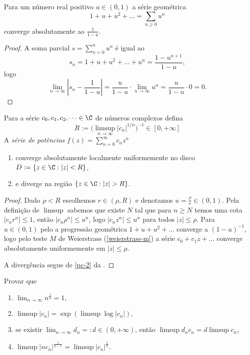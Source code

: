 \begin{prop}
\label{serie-geometrica}
Para um número real positivo $u\in(0,1)$ a série geométrica
\[ 1 + u + u^2 + \dots = \sum_{n\geq 0} u^n \]
converge absolutamente ao $\frac{1}{1-u}$.
\end{prop}
\begin{proof}
A soma parcial $s = \sum_{n=0}^n u^n$ é igual ao
\[ s_n = 1 + u + u^2 + \dots + u^n = \frac{1-u^{n+1}}{1-u}, \]
logo
\[ \lim_{n\to\infty} |s_n - \frac{1}{1-u}|
 = \frac{u}{1-u} \cdot \lim_{n\to\infty} u^n
 = \frac{u}{1-u} \cdot 0 = 0. \]
\end{proof}

\begin{lema}
\label{cauchy-hadamard}
Para a série $c_0,c_1,c_2,\dots \in \C$ de números complexos defina
\begin{equation}
\label{eq:hadamard}
R := \big(\limsup_{n\to\infty} |c_n|^{1/n}\big)^{-1} \in [0,+\infty]
\end{equation}
A \emph{série de potências} $f(z) = \sum_{n=0}^\infty c_n z^n$
\begin{enumerate}
\item converge absolutamente localmente uniformemente no disco $D := \{z\in\C: |z|<R \}$,
\item e diverge na região $\{ z\in\C: |z| > R \}$.
\end{enumerate}
\end{lema}
\begin{proof}
Dado $\rho < R$ escolhemos $r \in (\rho,R)$ e denotamos $u=\frac{\rho}{r} \in (0,1)$.
Pela definição de $\limsup$ sabemos que existe $N$
tal que para $n\geq N$ temos uma cota $|c_n r^n| \leq 1$,
então $|c_n \rho^n| \leq u^n$, logo $|c_n z^n| \leq u^n$ para todos $|z|\leq\rho$.
Para $u\in(0,1)$ pelo 
a progressão geométrica $1+u+u^2 + \dots$ converge a $(1-u)^{-1}$,
logo pelo teste $M$ de Weierstrass (\cref{weierstrass-m})
a série $c_0 + c_1 z + \dots$ converge absolutamente uniformemente em $|z|\leq\rho$.

A divergência segue de \cref{pc-2} da .
\end{proof}

\begin{problema}
\label{raio-derivada}
Provar que
\begin{enumerate}
\item $\lim_{n\to\infty} n^{\frac1n} = 1,$
\item $\limsup |c_n| = \exp(\limsup \log|c_n|),$
\item  se existir $\lim_{n\to \infty} d_n =: d \in(0,+\infty)$, então $\limsup d_n c_n = d \limsup c_n$,
\item \label{rd-4} $\limsup |n c_n|^{\frac1{n-1}} = \limsup |c_n|^{\frac{1}n}$.
\end{enumerate}
\end{problema}


